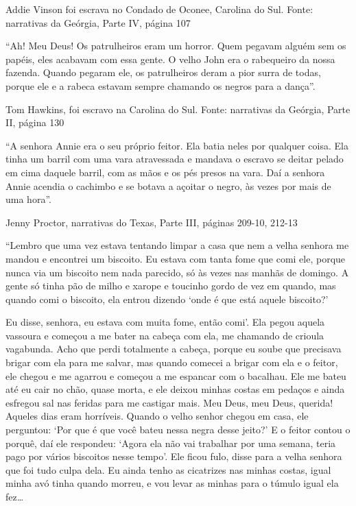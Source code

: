 Addie Vinson foi escrava no Condado de Oconee, Carolina do Sul. Fonte:
narrativas da Geórgia, Parte IV, página 107

``Ah! Meu Deus! Os patrulheiros eram um horror. Quem pegavam alguém sem
os papéis, eles acabavam com essa gente. O velho John era o rabequeiro
da nossa fazenda. Quando pegaram ele, os patrulheiros deram a pior surra
de todas, porque ele e a rabeca estavam sempre chamando os negros para a
dança''.

Tom Hawkins, foi escravo na Carolina do Sul. Fonte: narrativas da
Geórgia, Parte II, página 130

``A senhora Annie era o seu próprio feitor. Ela batia neles por qualquer
coisa. Ela tinha um barril com uma vara atravessada e mandava o escravo
se deitar pelado em cima daquele barril, com as mãos e os pés presos na
vara. Daí a senhora Annie acendia o cachimbo e se botava a açoitar o
negro, às vezes por mais de uma hora''.

Jenny Proctor, narrativas do Texas, Parte III, páginas 209-10, 212-13

``Lembro que uma vez estava tentando limpar a casa que nem a velha
senhora me mandou e encontrei um biscoito. Eu estava com tanta fome que
comi ele, porque nunca via um biscoito nem nada parecido, só às vezes
nas manhãs de domingo. A gente só tinha pão de milho e xarope e toucinho
gordo de vez em quando, mas quando comi o biscoito, ela entrou dizendo
`onde é que está aquele biscoito?'

Eu disse, senhora, eu estava com muita fome, então comi'. Ela pegou
aquela vassoura e começou a me bater na cabeça com ela, me chamando de
crioula vagabunda. Acho que perdi totalmente a cabeça, porque eu soube
que precisava brigar com ela para me salvar, mas quando comecei a brigar
com ela e o feitor, ele chegou e me agarrou e começou a me espancar com
o bacalhau. Ele me bateu até eu cair no chão, quase morta, e ele deixou
minhas costas em pedaços e ainda esfregou sal nas feridas para me
castigar mais. Meu Deus, meu Deus, querida! Aqueles dias eram horríveis.
Quando o velho senhor chegou em casa, ele perguntou: `Por que é que você
bateu nessa negra desse jeito?' E o feitor contou o porquê, daí ele
respondeu: `Agora ela não vai trabalhar por uma semana, teria pago por
vários biscoitos nesse tempo'. Ele ficou fulo, disse para a velha
senhora que foi tudo culpa dela. Eu ainda tenho as cicatrizes nas minhas
costas, igual minha avó tinha quando morreu, e vou levar as minhas para
o túmulo igual ela fez\ldots{}

